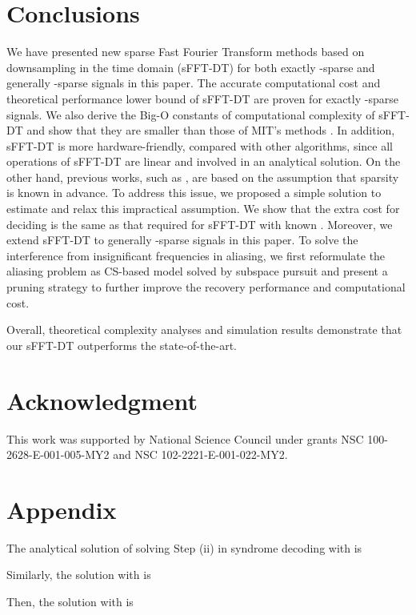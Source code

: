 \documentclass[journal,onecolumn,11pt]{IEEEtran}
\begin{document}
\section{Conclusions}\label{Sec: Conclusions}
We have presented new sparse Fast Fourier Transform methods based on downsampling in the time domain (sFFT-DT) for both exactly -sparse and generally -sparse signals in this paper.
The accurate computational cost and theoretical performance lower bound of sFFT-DT are proven for exactly -sparse signals.
We also derive the Big-O constants of computational complexity of sFFT-DT and show that they are smaller than those of MIT's methods \cite{Haitham2012}\cite{Haitham2012_1}\cite{Ghazi2013}.
In addition, sFFT-DT is more hardware-friendly, compared with other algorithms, since all operations of sFFT-DT are linear and involved in an analytical solution.
On the other hand, previous works, such as \cite{Haitham2012}\cite{Haitham2012_1}\cite{Ghazi2013}, are based on the assumption that sparsity  is known in advance.
To address this issue, we proposed a simple solution to estimate  and relax this impractical assumption.
We show that the extra cost for deciding  is the same as that required for sFFT-DT with known .
Moreover, we extend sFFT-DT to generally -sparse signals in this paper.
To solve the interference from insignificant frequencies in aliasing, we first reformulate the aliasing problem as CS-based model solved by subspace pursuit and present a pruning strategy to further improve the recovery performance and computational cost.

Overall, theoretical complexity analyses and simulation results demonstrate that our sFFT-DT outperforms the state-of-the-art.




\section{Acknowledgment}
This work was supported by National Science Council under grants NSC 100-2628-E-001-005-MY2 and NSC 102-2221-E-001-022-MY2.


\section{Appendix}\label{Sec: Appendix}
\footnotesize
The analytical solution of solving Step (ii) in syndrome decoding with  is

Similarly, the solution with  is

Then, the solution with  is





\ifCLASSOPTIONcaptionsoff
  \newpage
\fi



			
\end{document}
